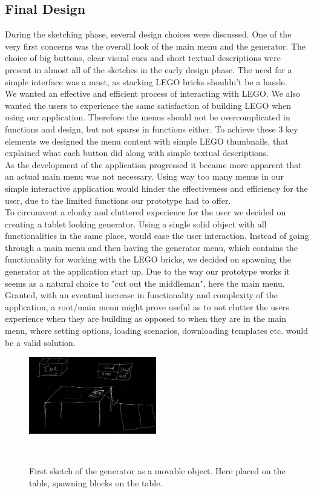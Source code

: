\subsection{Final Design}
During the sketching phase, several design choices were discussed. One of the very first concerns was the overall look of the main menu and the generator. The choice of big buttons, clear visual cues and short textual descriptions were present in almost all of the sketches in the early design phase. The need for a simple interface was a must, as stacking LEGO bricks shouldn't be a hassle. \\
We wanted an effective and efficient process of interacting with LEGO. We also wanted the users to experience the same satisfaction of building LEGO when using our application. Therefore the menus should not be overcomplicated in functions and design, but not sparse in functions either. To achieve these 3 key elements we designed the menu content with simple LEGO thumbnails, that explained what each button did along with simple textual descriptions. \\
As the development of the application progressed it became more  apparent that an actual main menu was not necessary. Using way too many menus in our simple interactive application would hinder the effectiveness and efficiency for the user, due to the limited functions our prototype had to offer. \\
To circumvent a clonky and cluttered experience for the user we decided on creating a tablet looking generator. Using a single solid object with all functionalities in the same place, would ease the user interaction. Instead of going through a main menu and then having the generator menu, which contains the functionality for working with the LEGO bricks, we decided on spawning the generator at the application start up. Due to the way our prototype works it seems as a natural choice to "cut out the middleman", here the main menu.  \\ 
Granted, with an eventual increase in functionality and complexity of the application, a root/main menu might prove useful as to not clutter the users experience when they are building as opposed to when they are in the main menu, where setting options, loading scenarios, downloading templates etc. would be a valid solution.\\
\begin{figure}[t]
	\centering
	\includegraphics[width=210px]{figures/Generator/gen6.png}
	\caption{First sketch of the generator as a movable object. Here placed on the table, spawning blocks on the table.}~\label{fig:finaldesign}
\end{figure}
